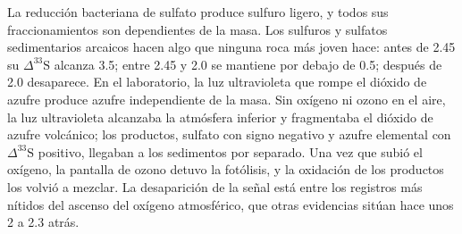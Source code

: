 La reducción bacteriana de sulfato produce sulfuro ligero, y todos sus fraccionamientos
son dependientes de la masa. Los sulfuros y sulfatos sedimentarios arcaicos hacen algo que
ninguna roca más joven hace: antes de \qty{2.45}{\Ga} su $\Delta^{33}\mathrm S$ alcanza
\qty{3.5}{\permil}; entre 2.45 y \qty{2.0}{\Ga} se mantiene por debajo de
\qty{0.5}{\permil}; después de \qty{2.0}{\Ga} desaparece. En el laboratorio,
la luz ultravioleta que rompe el dióxido de azufre produce azufre independiente de la masa.
Sin oxígeno ni ozono en el aire, la luz ultravioleta alcanzaba la atmósfera inferior
y fragmentaba el dióxido de azufre volcánico; los productos, sulfato con
signo negativo y azufre elemental con $\Delta^{33}\mathrm S$ positivo, llegaban a los
sedimentos por separado. Una vez que subió el oxígeno, la pantalla de ozono detuvo la
fotólisis, y la oxidación de los productos los volvió a mezclar. La
desaparición de la señal está entre los registros más nítidos del ascenso del
oxígeno atmosférico, que otras evidencias sitúan hace unos 2 a \qty{2.3}{\Ga}
atrás.

\begin{omfigure}

\par{}\label{fig:b3:stable-isotopes:three-isotope}
\end{omfigure}


